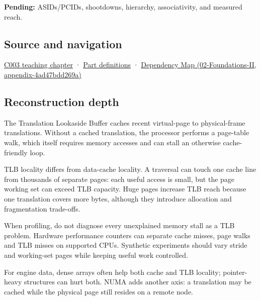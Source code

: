 \textbf{Pending:} ASIDs/PCIDs, shootdowns, hierarchy, associativity, and measured reach.

\subsection{Source and navigation}\label{appendix-7a2d9c5ce511-source-and-navigation}

\hyperref[01-foundations-i-ch002-where-the-bytes-live]{C003 teaching chapter} · \hyperref[appendix-fd090d982a15-m003---parts-41-60]{Part definitions} · \href{../02-Foundations-II/main.pdf\#nameddest=appendix-4ad47bdd269a}{Dependency Map (02-Foundations-II, appendix-4ad47bdd269a)}

\subsection{Reconstruction depth}\label{appendix-7a2d9c5ce511-reconstruction-depth}

The Translation Lookaside Buffer caches recent virtual-page to physical-frame translations. Without a cached translation, the processor performs a page-table walk, which itself requires memory accesses and can stall an otherwise cache-friendly loop.

TLB locality differs from data-cache locality. A traversal can touch one cache line from thousands of separate pages: each useful access is small, but the page working set can exceed TLB capacity. Huge pages increase TLB reach because one translation covers more bytes, although they introduce allocation and fragmentation trade-offs.

When profiling, do not diagnose every unexplained memory stall as a TLB problem. Hardware performance counters can separate cache misses, page walks and TLB misses on supported CPUs. Synthetic experiments should vary stride and working-set pages while keeping useful work controlled.

For engine data, dense arrays often help both cache and TLB locality; pointer-heavy structures can hurt both. NUMA adds another axis: a translation may be cached while the physical page still resides on a remote node.
